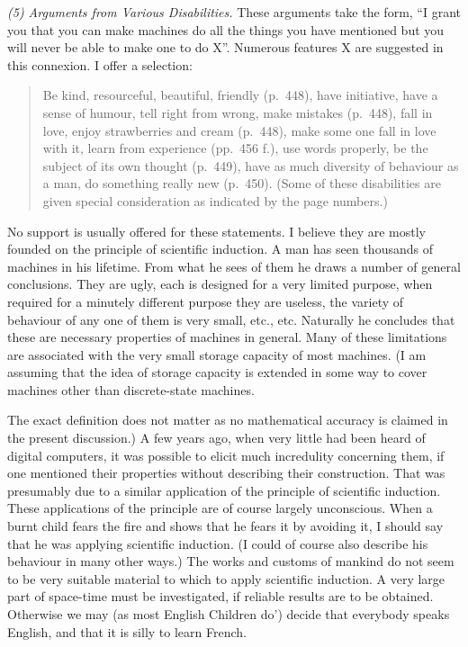 \documentclass[10pt]{article} %
\begin{document}
\noindent\normalfont \textit{(5) Arguments from Various Disabilities.} These arguments take the form, ``I grant you that you can make machines do all the things you have mentioned but you will never be able to make one to do X''. Numerous features X are suggested in this connexion. I offer a selection:

\begin{quote} %
Be kind, resourceful, beautiful, friendly (p.~448), have initiative, have a sense of humour, tell right from wrong, make mistakes (p.~448), fall in love, enjoy strawberries and cream (p.~448), make some one fall in love with it, learn from experience (pp.~456 f.), use words properly, be the subject of its own thought (p.~449), have as much diversity of behaviour as a man, do something really new (p.~450). (Some of these disabilities are given special consideration as indicated by the page numbers.)
\end{quote}

No support is usually offered for these statements. I believe they are mostly founded on the principle of scientific induction. A man has seen thousands of machines in his lifetime. From what he sees of them he draws a number of general conclusions. They are ugly, each is designed for a very limited purpose, when required for a minutely different purpose they are useless, the variety of behaviour of any one of them is very small, etc., etc. Naturally he concludes that these are necessary properties of machines in general. Many of these limitations are associated with the very small storage capacity of most machines. (I am assuming that the idea of storage capacity is extended in some way to cover machines other than discrete-state machines.

The exact definition does not matter as no mathematical accuracy is claimed in the present discussion.) A few years ago, when very little had been heard of digital computers, it was possible to elicit much incredulity concerning them, if one mentioned their properties without describing their construction. That was presumably due to a similar application of the principle of scientific induction. These applications of the principle are of course largely unconscious. When a burnt child fears the fire and shows that he fears it by avoiding it, I should say that he was applying scientific induction. (I could of course also describe his behaviour in many other ways.) The works and customs of mankind do not seem to be very suitable material to which to apply scientific induction. A very large part of space-time must be investigated, if reliable results are to be obtained. Otherwise we may (as most English \textquotesingle Children do') decide that everybody speaks English, and that it is silly to learn French.
\end{document}
